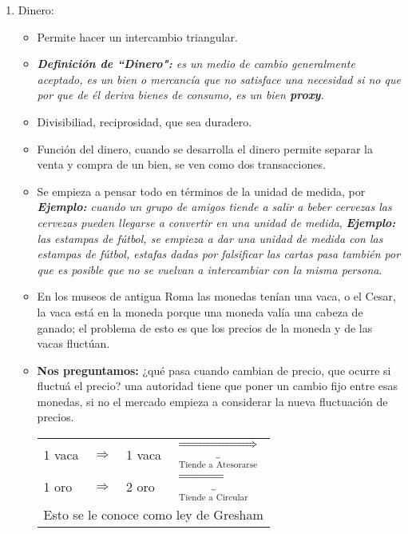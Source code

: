 \begin{enumerate}
\begin{enumerate}
        \item Dinero:
            \begin{itemize}
                \item Permite hacer un intercambio triangular.
                \item \emph{\textbf{Definición de ``Dinero":} es un medio de cambio generalmente aceptado, es un bien o mercancía que no satisface una necesidad si no que por que de él deriva bienes de consumo, es un bien \textbf{proxy}.}
                \item Divisibiliad, reciprosidad, que sea duradero.
                \item Función del dinero, cuando se desarrolla el dinero permite separar la venta y compra de un bien, se ven como dos transacciones.
                \item Se empieza a pensar todo en términos de la unidad de medida, por \emph{\textbf{Ejemplo:} cuando un grupo de amigos tiende a salir a beber cervezas las cervezas pueden llegarse a convertir en una unidad de medida}, \emph{\textbf{Ejemplo:} las estampas de fútbol, se empieza a dar una unidad de medida con las estampas de fútbol, estafas dadas por falsificar las cartas pasa también por que es posible que no se vuelvan a intercambiar con la misma persona}.
                \item En los museos de antigua Roma las monedas tenían una vaca, o el Cesar, la vaca está en la moneda porque una moneda valía una cabeza de ganado; el problema de esto es que los precios de la moneda y de las vacas fluctúan.
                \item \textbf{Nos preguntamos:} ¿qué pasa cuando cambian de precio, que ocurre si fluctuá el precio? una autoridad tiene que poner un cambio fijo entre esas monedas, si no el mercado empieza a considerar la nueva fluctuación de precios.
                \begin{center}
                \begin{tabular}{ | p{2cm} | p{2cm} | p{2cm} | p{3cm} | }
                 \hline
                 1 vaca & $\Rightarrow$ & 1 vaca & $\underbrace{\Rightarrow}_{\text{Tiende a Atesorarse}}$ \\ %
                 1 oro & $\Rightarrow$ & 2 oro & $\underbrace{\Rightarrow}_{\text{Tiende a Circular}}$ \\ 
                \hline
                 \multicolumn{4}{|c|}{Esto se le conoce como ley de Gresham}\\ 
                 \hline
                \end{tabular}
                \end{center}
                

\end{itemize}
\end{enumerate}
\end{enumerate}
